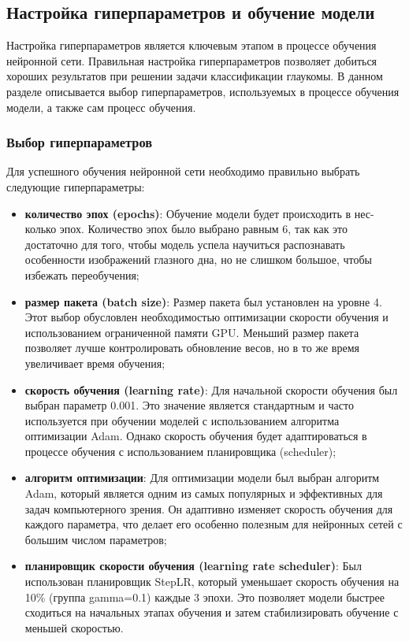 {    %

    \subsection{Настройка гиперпараметров и обучение модели}

    Настройка гиперпараметров является ключевым этапом в процессе обучения нейронной сети. Правильная настройка гиперпараметров позволяет добиться хороших результатов при решении задачи классификации глаукомы. В данном разделе описывается выбор гиперпараметров, используемых в процессе обучения модели, а также сам процесс обучения.

    \subsubsection*{Выбор гиперпараметров}

    Для успешного обучения нейронной сети необходимо правильно выбрать следующие гиперпараметры:

    \begin{itemize}
        \item \textbf{количество эпох (epochs)}: Обучение модели будет происходить в нес- \\ колько эпох. Количество эпох было выбрано равным 6, так как это достаточно для того, чтобы модель успела научиться распознавать особенности изображений глазного дна, но не слишком большое, чтобы избежать переобучения;
        \item \textbf{размер пакета (batch size)}: Размер пакета был установлен на уровне 4. Этот выбор обусловлен необходимостью оптимизации скорости обучения и использованием ограниченной памяти GPU. Меньший размер пакета позволяет лучше контролировать обновление весов, но в то же время увеличивает время обучения;
        \item \textbf{скорость обучения (learning rate)}: Для начальной скорости обучения был выбран параметр 0.001. Это значение является стандартным и часто используется при обучении моделей с использованием алгоритма оптимизации Adam. Однако скорость обучения будет адаптироваться в процессе обучения с использованием планировщика (scheduler);
        \item \textbf{алгоритм оптимизации}: Для оптимизации модели был выбран алгоритм Adam, который является одним из самых популярных и эффективных для задач компьютерного зрения. Он адаптивно изменяет скорость обучения для каждого параметра, что делает его особенно полезным для нейронных сетей с большим числом параметров;
        \item \textbf{планировщик скорости обучения (learning rate scheduler)}: Был использован планировщик StepLR, который уменьшает скорость обучения на 10\% (группа gamma=0.1) каждые 3 эпохи. Это позволяет модели быстрее сходиться на начальных этапах обучения и затем стабилизировать обучение с меньшей скоростью.
    \end{itemize}

}
